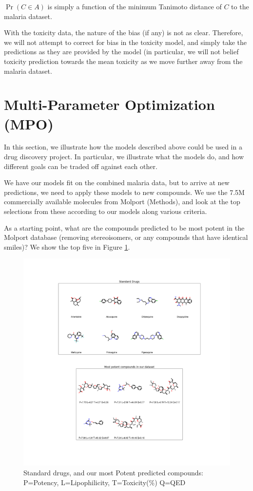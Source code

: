 \documentclass{article}
\begin{document}
$\Pr(C \in A)$ is simply a function of the minimum Tanimoto distance of $C$ to the malaria dataset.


With the toxicity data, the nature of the bias (if any) is not as clear.  Therefore, we will not attempt to correct for bias in the toxicity model, and simply take the predictions as they are provided by the model (in particular, we will not belief toxicity prediction towards the mean toxicity as we move further away from the malaria dataset.


\section{Multi-Parameter Optimization (MPO)}

In this section, we illustrate how the models described above could be used in a drug discovery project. In particular, we illustrate what the models do, and how different goals can be traded off against each other.

We have our models fit on the combined malaria data, but to arrive at new predictions, we need to apply these models to new compounds.  We use the 7.5M commercially available molecules from Molport (Methods), and look at the top selections from these according to our models along various criteria.

As a starting point, what are the compounds predicted to be most potent in the Molport database (removing stereoisomers, or any compounds that have identical 
smiles)?  We show the top five in Figure \ref{fig:mostpot}.

\begin{figure}[h!]
\centering
\includegraphics[width=\textwidth]{fig6_drugs_n_pot.png}
\caption{Standard drugs, and our most Potent predicted compounds: P=Potency, L=Lipophilicity, T=Toxicity(\%) Q=QED}
\label{fig:mostpot}
\end{figure}
\end{document}
